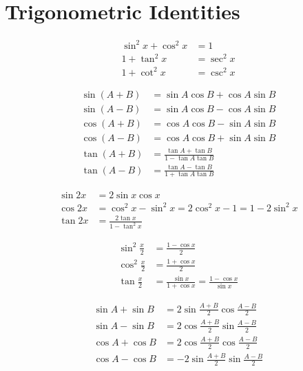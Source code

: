 \documentclass[12pt]{article}
\begin{document}
	\newpage

	\section*{Trigonometric Identities}

	\[
	\begin{aligned}
		\sin^2 x+\cos^2 x&=1 \\[0.5ex]
		1+\tan^2 x&=\sec^2 x \\[0.5ex]
		1+\cot^2 x&=\csc^2 x
	\end{aligned}
	\]

	\[
	\begin{aligned}
		\sin(A+B)&=\sin A\cos B+\cos A\sin B \\[0.5ex]
		\sin(A-B)&=\sin A\cos B-\cos A\sin B \\[0.5ex]
		\cos(A+B)&=\cos A\cos B-\sin A\sin B \\[0.5ex]
		\cos(A-B)&=\cos A\cos B+\sin A\sin B \\[0.5ex]
		\tan(A+B)&=\frac{\tan A+\tan B}{1-\tan A\tan B} \\[0.5ex]
		\tan(A-B)&=\frac{\tan A-\tan B}{1+\tan A\tan B}
	\end{aligned}
	\]

	\[
	\begin{aligned}
		\sin 2x&=2\sin x\cos x \\[0.5ex]
		\cos 2x&=\cos^2 x-\sin^2 x=2\cos^2 x-1=1-2\sin^2 x \\[0.5ex]
		\tan 2x&=\frac{2\tan x}{1-\tan^2 x}
	\end{aligned}
	\]

	\[
	\begin{aligned}
		\sin^2 \frac{x}{2}&=\frac{1-\cos x}{2} \\[0.5ex]
		\cos^2 \frac{x}{2}&=\frac{1+\cos x}{2} \\[0.5ex]
		\tan \frac{x}{2}&=\frac{\sin x}{1+\cos x}=\frac{1-\cos x}{\sin x}
	\end{aligned}
	\]

	\[
	\begin{aligned}
		\sin A+\sin B&=2\sin \frac{A+B}{2}\cos \frac{A-B}{2} \\[0.5ex]
		\sin A-\sin B&=2\cos \frac{A+B}{2}\sin \frac{A-B}{2} \\[0.5ex]
		\cos A+\cos B&=2\cos \frac{A+B}{2}\cos \frac{A-B}{2} \\[0.5ex]
		\cos A-\cos B&=-2\sin \frac{A+B}{2}\sin \frac{A-B}{2}
	\end{aligned}
	\]
\end{document}

